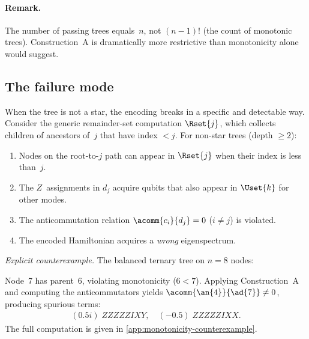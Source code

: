 \paragraph{Remark.}
The number of passing trees equals~$n$, not $(n{-}1)!$ (the count of
monotonic trees).  Construction~A is dramatically more
restrictive than monotonicity alone would suggest.

\subsection{The failure mode}
\label{sec:st-failure}

When the tree is not a star, the encoding breaks in a specific and
detectable way.  Consider the generic remainder-set computation
$\Rset{j}$, which collects children of ancestors of~$j$ that have
index $< j$.  For non-star trees (depth $\ge 2$):

\begin{enumerate}
  \item Nodes on the root-to-$j$ path can appear in $\Rset{j}$ when
    their index is less than~$j$.
  \item The $Z$~assignments in $d_j$ acquire qubits that also appear
    in $\Uset{k}$ for other modes.
  \item The anticommutation relation $\acomm{c_i}{d_j} = 0$
    ($i \neq j$) is violated.
  \item The encoded Hamiltonian acquires a \emph{wrong} eigenspectrum.
\end{enumerate}

\textit{Explicit counterexample.}  The balanced ternary tree on
$n = 8$ nodes:
\begin{center}
\end{center}
Node~7 has parent~6, violating monotonicity ($6 < 7$).  Applying
Construction~A and computing the anticommutators yields
$\acomm{\an{4}}{\ad{7}} \neq 0$, producing spurious terms:
\begin{align*}
  (0.5i)\; ZZZZZIXY, \quad (-0.5)\; ZZZZZIXX.
\end{align*}
The full computation is given in \cref{app:monotonicity-counterexample}.


